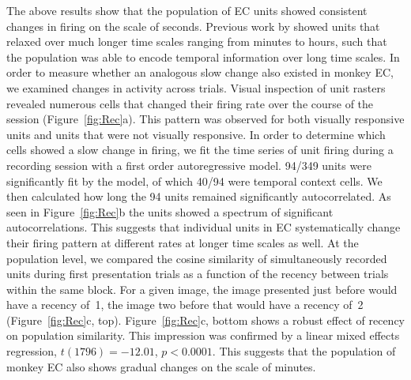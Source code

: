 \documentclass{apa}
\begin{document}
The above results show that the population of EC units showed consistent
changes in firing on the scale of seconds. Previous work by 
showed units that relaxed over much longer time scales ranging from minutes to hours,
such that the population was able to encode temporal information over
long time scales. In order to measure whether an analogous slow change
also existed in monkey EC, we examined changes in activity across trials.
Visual inspection of unit rasters revealed numerous cells that changed their 
firing rate over the course of the session (Figure~\ref{fig:Rec}a).  
This pattern was observed for both visually responsive units
and units that were not visually responsive. 
In order to determine which cells showed a slow change in firing, 
we fit the time series of unit firing during a recording 
session with a first order autoregressive model. 94/349 units were significantly fit 
by the model, of which 40/94 were temporal context cells. We then calculated how
long the 94 units remained significantly autocorrelated. 
As seen in Figure~\ref{fig:Rec}b
the units showed a spectrum of significant autocorrelations.
This suggests that individual units in EC systematically change
their firing pattern at different rates at longer time scales as well. 
At the population level, we compared the cosine similarity of 
simultaneously recorded units during first presentation 
trials as a function of the
recency between trials within the same block.  
For a given image, the image presented just
before would have a recency of~1,
the image two before that would have a recency of~2 (Figure~\ref{fig:Rec}c, top). 
Figure~\ref{fig:Rec}c, bottom shows a robust effect of recency on population
similarity.
This impression was confirmed by a linear mixed effects regression, $t(1796)=-12.01$, $p <0.0001$. This
suggests that the population of monkey EC also shows gradual changes on the scale of
minutes.
\end{document}
